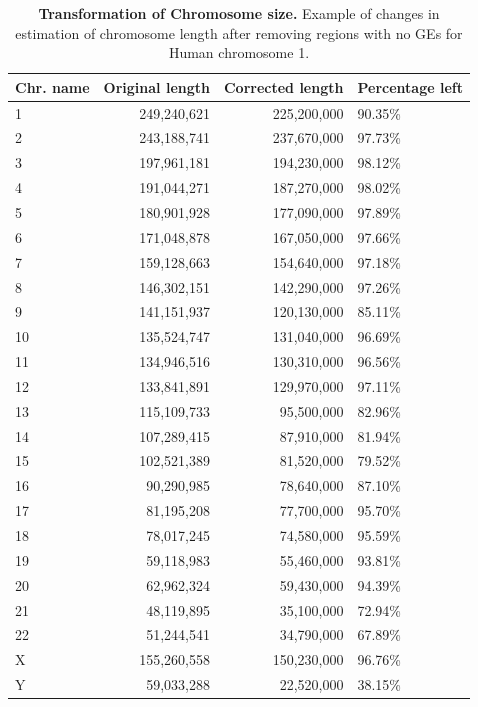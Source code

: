 \begin{table}[htbp]
\begin{center}
\begin{tabular}{ l r r l }
\hline

  \textbf{Chr. name} & \textbf{Original length} & \textbf{Corrected length} & \textbf{Percentage left} \\ \hline
  1  & 249,240,621 & 225,200,000 & 90.35\% \\
  2  & 243,188,741 & 237,670,000 & 97.73\% \\
  3  & 197,961,181 & 194,230,000 & 98.12\% \\
  4  & 191,044,271 & 187,270,000 & 98.02\% \\
  5  & 180,901,928 & 177,090,000 & 97.89\% \\
  6  & 171,048,878 & 167,050,000 & 97.66\% \\
  7  & 159,128,663 & 154,640,000 & 97.18\% \\
  8  & 146,302,151 & 142,290,000 & 97.26\% \\
  9  & 141,151,937 & 120,130,000 & 85.11\% \\
  10 & 135,524,747 & 131,040,000 & 96.69\% \\
  11 & 134,946,516 & 130,310,000 & 96.56\% \\
  12 & 133,841,891 & 129,970,000 & 97.11\% \\
  13 & 115,109,733 &  95,500,000 & 82.96\% \\
  14 & 107,289,415 &  87,910,000 & 81.94\% \\
  15 & 102,521,389 &  81,520,000 & 79.52\% \\
  16 &  90,290,985 &  78,640,000 & 87.10\% \\
  17 &  81,195,208 &  77,700,000 & 95.70\% \\
  18 &  78,017,245 &  74,580,000 & 95.59\% \\
  19 &  59,118,983 &  55,460,000 & 93.81\% \\
  20 &  62,962,324 &  59,430,000 & 94.39\% \\
  21 &  48,119,895 &  35,100,000 & 72.94\% \\
  22 &  51,244,541 &  34,790,000 & 67.89\% \\
  X  & 155,260,558 & 150,230,000 & 96.76\% \\
  Y  &  59,033,288 &  22,520,000 & 38.15\% \\ \hline

\end{tabular}
\end{center}
\caption[Transformation of Chromosome size.]{\textbf{Transformation of Chromosome size.} Example of changes in estimation of chromosome length after removing regions with no GEs for Human chromosome 1.}
\label{tab:example_chrom_size}
\end{table}


